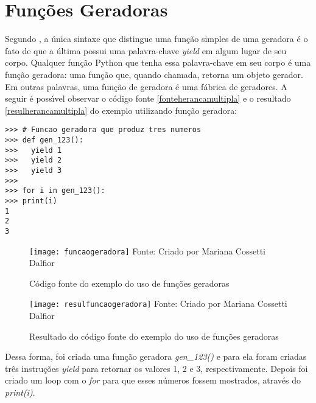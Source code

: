 \section{Fun\c{c}\~{o}es Geradoras}

Segundo \cite{Sarma2021}, a \'{u}nica sintaxe que distingue uma fun\c{c}\~{a}o simples de uma geradora \'{e} o fato de que a \'{u}ltima possui uma palavra-chave \textsl{yield} em algum lugar de seu corpo. Qualquer fun\c{c}\~{a}o Python que tenha essa palavra-chave em seu corpo \'{e} uma fun\c{c}\~{a}o geradora: uma fun\c{c}\~{a}o que, quando chamada, retorna um objeto gerador. Em outras palavras, uma fun\c{c}\~{a}o de geradora \'{e} uma f\'{a}brica de geradores. A seguir \'{e} poss\'{\i}vel observar o c\'{o}digo fonte \ref{fonteherancamultipla} e o resultado \ref{resulherancamultipla} do exemplo utilizando fun\c{c}\~{a}o geradora:

\begin{lstlisting}
>>> # Funcao geradora que produz tres numeros
>>> def gen_123():
>>>	  yield 1
>>>	  yield 2
>>>	  yield 3
>>>
>>> for i in gen_123():
>>>	print(i)
1
2
3
\end{lstlisting}

\begin{figure}[H]
	\begin{center}
		\caption{C\'{o}digo fonte do exemplo do uso de fun\c{c}\~{o}es geradoras} \label{fontefuncaogeradora}
		\texttt{[image: funcaogeradora]} 
		\newline
		Fonte: Criado por Mariana Cossetti Dalfior
	\end{center}
\end{figure}

\begin{figure}[H]
	\begin{center}
		\caption{Resultado do c\'{o}digo fonte do exemplo do uso de fun\c{c}\~{o}es geradoras} \label{resulfuncaogeradora}
		\texttt{[image: resulfuncaogeradora]} 
		\newline
		Fonte: Criado por Mariana Cossetti Dalfior
	\end{center}
\end{figure}

Dessa forma, foi criada uma fun\c{c}\~{a}o geradora \textsl{gen\_123()} e para ela foram criadas tr\^{e}s instru\c{c}\~{o}es \textsl{yield} para retornar os valores 1, 2 e 3, respectivamente. Depois foi criado um loop com o \textsl{for} para que esses n\'{u}meros fossem mostrados, atrav\'{e}s do \textsl{print(i)}.
